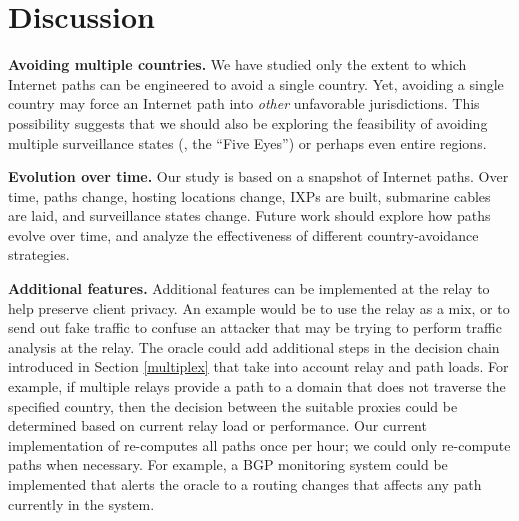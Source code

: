\section{Discussion}
\label{sec:discussion}

\textbf{Avoiding multiple countries.} 
We have studied only the extent to which Internet paths can be
engineered to avoid a {single} country.  Yet, avoiding a single country
may force an Internet path into {\em other} unfavorable
jurisdictions. This possibility suggests that we should also be
exploring the feasibility of avoiding multiple surveillance states (\eg,
the ``Five Eyes'') or perhaps even entire regions. 

\textbf{Evolution over time.}
Our study is based on a snapshot of Internet paths. Over time, paths
change, hosting locations change, IXPs are built, submarine cables are
laid, and surveillance states change.  Future work should explore how
paths evolve over time, and analyze the effectiveness of different
country-avoidance strategies.


\textbf{Additional features.}  Additional features can be
implemented at the relay to help preserve client privacy.  An example
would be to use the relay as a mix, or to send out fake traffic to
confuse an attacker that may be trying to perform traffic analysis at
the relay.  The oracle could add additional steps in the decision
chain introduced in Section \ref{multiplex} that take into account
relay and path loads.  For example, if multiple relays provide a path
to a domain that does not traverse the specified country, then the
decision between the suitable proxies could be determined based on
current relay load or performance.  Our current implementation of
\system{} re-computes all paths once per hour; we could only
re-compute paths when necessary.  For example, a BGP monitoring system
could be implemented that alerts the oracle to a routing changes that
affects any path currently in the system.
